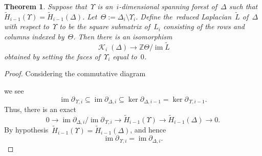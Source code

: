 \documentclass[12pt]{article}
\newcommand{\Z}{\mathbb{Z}}
\newcommand{\tH}{\widetilde{H}}
\DeclareMathOperator{\im}{\mathrm{im}}
\DeclareMathOperator{\crit}{\mathcal{K}}
\newcommand{\pup}[1]{\partial_{\,\Upsilon,{#1}}}
\newtheorem{theorem}{Theorem}[section]
\theoremstyle{definition}
\theoremstyle{remark}
\begin{document}
\begin{theorem}  Suppose that~$\Upsilon$ is an~$i$-dimensional spanning forest
  of~$\Delta$ such that $\tH_{i-1}(\Upsilon)=\tH_{i-1}(\Delta)$.
  Let~$\Theta:=\Delta_i\setminus\Upsilon_i$.  Define the~{\em reduced
  Laplacian}~$\tilde{L}$ of~$\Delta$ with respect to~$\Upsilon$ to be the square submatrix
  of~$L_{i}$ consisting of the rows and columns indexed
  by~$\Theta$.  Then there is an isomorphism
  \[
    \crit_{i}(\Delta)\to\Z\Theta/\im\tilde{L}
  \]
  obtained by setting the faces of~$\Upsilon_{i}$ equal to~$0$.
\end{theorem}
\begin{proof}  Considering the commutative diagram
\begin{center}
\end{center}
  we see
\[
  \im\pup{i}\subseteq\im\partial_{\Delta,i}\subseteq\ker\partial_{\Delta,i-1}=
  \ker\pup{i-1}.
\]
Thus, there is an exact
\[
  0\to\im\partial_{\Delta,i}/\im\pup{i}\to\tH_{i-1}(\Upsilon)\to\tH_{i-1}(\Delta)\to0.
\]
By hypothesis~$\tH_{i-1}(\Upsilon)=\tH_{i-1}(\Delta)$, and hence
\[
  \im\pup{i}=\im\partial_{\Delta,i}.
\]


\end{proof}
\end{document}
